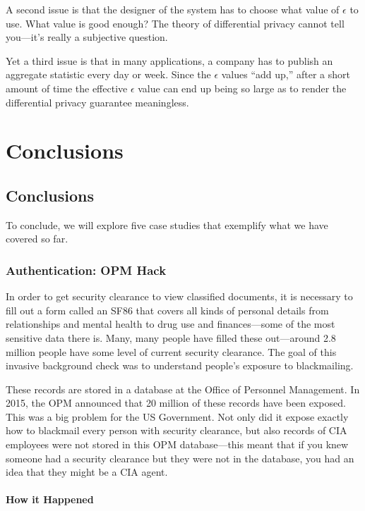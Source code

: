 \documentclass[
  letterpaper,
]{scrbook}
\theoremstyle{definition}
\theoremstyle{plain}
\theoremstyle{plain}
\theoremstyle{remark}
\begin{document}
A second issue is that the designer of the system has to choose what
value of \(\epsilon\) to use. What value is good enough? The theory of
differential privacy cannot tell you---it's really a subjective
question.

Yet a third issue is that in many applications, a company has to publish
an aggregate statistic every day or week. Since the \(\epsilon\) values
``add up,'' after a short amount of time the effective \(\epsilon\)
value can end up being so large as to render the differential privacy
guarantee meaningless.

\part{Conclusions}

\chapter{Conclusions}\label{conclusions-1}

To conclude, we will explore five case studies that exemplify what we
have covered so far.

\section{Authentication: OPM Hack}\label{authentication-opm-hack}

In order to get security clearance to view classified documents, it is
necessary to fill out a form called an SF86 that covers all kinds of
personal details from relationships and mental health to drug use and
finances---some of the most sensitive data there is. Many, many people
have filled these out---around 2.8 million people have some level of
current security clearance. The goal of this invasive background check
was to understand people's exposure to blackmailing.

These records are stored in a database at the Office of Personnel
Management. In 2015, the OPM announced that 20 million of these records
have been exposed. This was a big problem for the US Government. Not
only did it expose exactly how to blackmail every person with security
clearance, but also records of CIA employees were not stored in this OPM
database---this meant that if you knew someone had a security clearance
but they were not in the database, you had an idea that they might be a
CIA agent.

\subsection{How it Happened}\label{how-it-happened}
\end{document}
